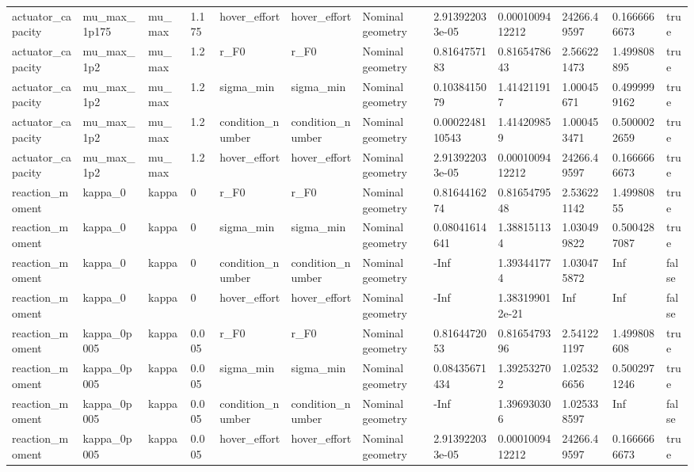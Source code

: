 \begin{tabular}{@{}llllllllllll@{}}
actuator\_capacity & mu\_max\_1p175 & mu\_max & 1.175 & hover\_effort & hover\_effort & Nominal geometry & 2.913922033e-05 & 0.0001009412212 & 24266.49597 & 0.1666666673 & true \\
actuator\_capacity & mu\_max\_1p2 & mu\_max & 1.2 & r\_F0 & r\_F0 & Nominal geometry & 0.8164757183 & 0.8165478643 & 2.566221473 & 1.499808895 & true \\
actuator\_capacity & mu\_max\_1p2 & mu\_max & 1.2 & sigma\_min & sigma\_min & Nominal geometry & 0.1038415079 & 1.414211917 & 1.00045671 & 0.4999999162 & true \\
actuator\_capacity & mu\_max\_1p2 & mu\_max & 1.2 & condition\_number & condition\_number & Nominal geometry & 0.0002248110543 & 1.414209859 & 1.000453471 & 0.5000022659 & true \\
actuator\_capacity & mu\_max\_1p2 & mu\_max & 1.2 & hover\_effort & hover\_effort & Nominal geometry & 2.913922033e-05 & 0.0001009412212 & 24266.49597 & 0.1666666673 & true \\
reaction\_moment & kappa\_0 & kappa & 0 & r\_F0 & r\_F0 & Nominal geometry & 0.8164416274 & 0.8165479548 & 2.536221142 & 1.49980855 & true \\
reaction\_moment & kappa\_0 & kappa & 0 & sigma\_min & sigma\_min & Nominal geometry & 0.08041614641 & 1.388151134 & 1.030499822 & 0.5004287087 & true \\
reaction\_moment & kappa\_0 & kappa & 0 & condition\_number & condition\_number & Nominal geometry & -Inf & 1.393441774 & 1.030475872 & Inf & false \\
reaction\_moment & kappa\_0 & kappa & 0 & hover\_effort & hover\_effort & Nominal geometry & -Inf & 1.383199012e-21 & Inf & Inf & false \\
reaction\_moment & kappa\_0p005 & kappa & 0.005 & r\_F0 & r\_F0 & Nominal geometry & 0.8164472053 & 0.8165479396 & 2.541221197 & 1.499808608 & true \\
reaction\_moment & kappa\_0p005 & kappa & 0.005 & sigma\_min & sigma\_min & Nominal geometry & 0.08435671434 & 1.392532702 & 1.025326656 & 0.5002971246 & true \\
reaction\_moment & kappa\_0p005 & kappa & 0.005 & condition\_number & condition\_number & Nominal geometry & -Inf & 1.396930306 & 1.025338597 & Inf & false \\
reaction\_moment & kappa\_0p005 & kappa & 0.005 & hover\_effort & hover\_effort & Nominal geometry & 2.913922033e-05 & 0.0001009412212 & 24266.49597 & 0.1666666673 & true \\

\end{tabular}
